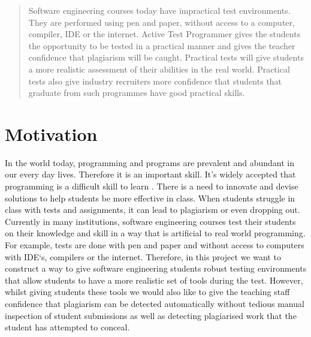 \documentclass[a1,portrait]{a0poster}
\begin{document}
\begin{multicols}{2} %

\color{Navy} %

\begin{abstract}

Software engineering courses today have impractical test environments. They are
performed using pen and paper, without access to a computer, compiler, IDE or
the internet. Active Test Programmer gives the students the opportunity to be
tested in a practical manner and gives the teacher confidence that plagiarism
will be caught. Practical tests will give students a more realistic assessment
of their abilities in the real world. Practical tests also give industry
recruiters more confidence that students that graduate from such programmes have
good practical skills. 

\end{abstract}

\color{SaddleBrown} %

\section*{Motivation}

In the world today, programming and programs are prevalent and abundant in our
every day lives. Therefore it is an important skill. It's
widely accepted that programming is a difficult skill to learn
\cite{jenkins2002difficulty, robins2003learning}. There is a need to innovate
and devise solutions to help students be more effective in class.
When students struggle in class with tests and assignments, it can lead to
plagiarism or even dropping out\cite{bennedsen2007failure}. Currently in many
institutions, software engineering courses test their students on their
knowledge and skill in a way that is artificial to real world programming.
For example, tests are done with pen and paper and without access to computers with
IDE`s, compilers or the internet. Therefore, in this project we want to construct a
way to give software engineering students robust testing environments that allow
students to have a more realistic set of tools during the test. However, whilst
giving students these tools we would also like to give the teaching staff
confidence that plagiarism can be detected automatically without tedious manual
inspection of student submissions as well as detecting plagiarised work that the
student has attempted to conceal.


\end{multicols}
\end{document}
